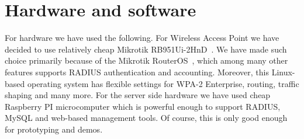 \section{Hardware and software}
\label{sec:hardware}

For hardware we have used the following. For Wireless Access Point we have decided to use 
relatively cheap Mikrotik RB951Ui-2HnD~\cite{mikrotik:rb951ui}. We have made 
such choice primarily because of the Mikrotik RouterOS~\cite{mikrotik:routeros}, 
which among many other features supports RADIUS authentication and accounting. Moreover, 
this Linux-based operating system has flexible settings for WPA-2 Enterprise, routing,
traffic shaping and many more. For the server side hardware we have used cheap Raspberry 
PI microcomputer which is powerful enough to support RADIUS, MySQL and web-based management 
tools. Of course, this is only good enough for prototyping and demos.

